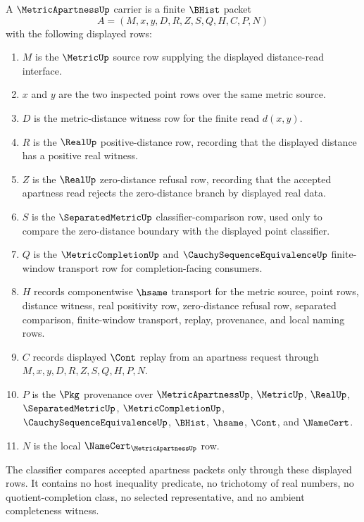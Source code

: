 \begin{definition}
\label{def:metric-apartness-carrier}
A $\MetricApartnessUp$ carrier is a finite $\BHist$ packet
$$
A=(M,x,y,D,R,Z,S,Q,H,C,P,N)
$$
with the following displayed rows:
\begin{enumerate}
\item $M$ is the $\MetricUp$ source row supplying the displayed distance-read interface.
\item $x$ and $y$ are the two inspected point rows over the same metric source.
\item $D$ is the metric-distance witness row for the finite read $d(x,y)$.
\item $R$ is the $\RealUp$ positive-distance row, recording that the displayed distance has a positive real witness.
\item $Z$ is the $\RealUp$ zero-distance refusal row, recording that the accepted apartness read rejects the zero-distance branch by displayed real data.
\item $S$ is the $\SeparatedMetricUp$ classifier-comparison row, used only to compare the zero-distance boundary with the displayed point classifier.
\item $Q$ is the $\MetricCompletionUp$ and $\CauchySequenceEquivalenceUp$ finite-window transport row for completion-facing consumers.
\item $H$ records componentwise $\hsame$ transport for the metric source, point rows, distance witness, real positivity row, zero-distance refusal row, separated comparison, finite-window transport, replay, provenance, and local naming rows.
\item $C$ records displayed $\Cont$ replay from an apartness request through $M,x,y,D,R,Z,S,Q,H,P,N$.
\item $P$ is the $\Pkg$ provenance over $\MetricApartnessUp$, $\MetricUp$, $\RealUp$, $\SeparatedMetricUp$, $\MetricCompletionUp$, $\CauchySequenceEquivalenceUp$, $\BHist$, $\hsame$, $\Cont$, and $\NameCert$.
\item $N$ is the local $\NameCert_{\MetricApartnessUp}$ row.
\end{enumerate}
The classifier compares accepted apartness packets only through these displayed rows. It contains no host inequality predicate, no trichotomy of real numbers, no quotient-completion class, no selected representative, and no ambient completeness witness.
\end{definition}

